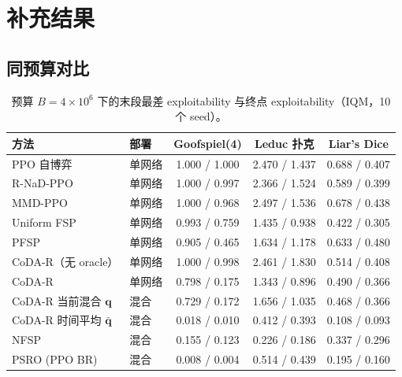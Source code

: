 \documentclass{article}
\theoremstyle{plain}
\theoremstyle{remark}
\newcommand{\bq}{{\bm{q}}}
\newcommand{\codar}{CoDA-R}
\newcommand{\rnad}{R-NaD-PPO}
\begin{document}
\FloatBarrier
\section{补充结果}
\label{app:extra}

\subsection{同预算对比}

\begin{table}[!htbp]
\caption{预算 $B=4\times10^6$ 下的末段最差 exploitability 与终点 exploitability（IQM，10 个 seed）。}
\label{tab:main-full}
\begin{center}
\footnotesize
\begin{tabular}{llccc}
\toprule
方法 & 部署 & Goofspiel(4) & Leduc 扑克 & Liar's Dice \\
\midrule
PPO 自博弈 & 单网络 & 1.000 / 1.000 & 2.470 / 1.437 & 0.688 / 0.407 \\
\rnad{} & 单网络 & 1.000 / 0.997 & 2.366 / 1.524 & 0.589 / 0.399 \\
MMD-PPO & 单网络 & 1.000 / 0.968 & 2.497 / 1.536 & 0.678 / 0.438 \\
Uniform FSP & 单网络 & 0.993 / 0.759 & 1.435 / 0.938 & 0.422 / 0.305 \\
PFSP & 单网络 & 0.905 / 0.465 & 1.634 / 1.178 & 0.633 / 0.480 \\
\codar{}（无 oracle） & 单网络 & 1.000 / 0.998 & 2.461 / 1.830 & 0.514 / 0.408 \\
\codar{} & 单网络 & 0.798 / 0.175 & 1.343 / 0.896 & 0.490 / 0.366 \\
\midrule
\codar{} 当前混合 $\bq$ & 混合 & 0.729 / 0.172 & 1.656 / 1.035 & 0.468 / 0.366 \\
\codar{} 时间平均 $\bar{\bq}$ & 混合 & 0.018 / 0.010 & 0.412 / 0.393 & 0.108 / 0.093 \\
NFSP & 混合 & 0.155 / 0.123 & 0.226 / 0.186 & 0.337 / 0.296 \\
PSRO (PPO BR) & 混合 & 0.008 / 0.004 & 0.514 / 0.439 & 0.195 / 0.160 \\
\bottomrule
\end{tabular}
\end{center}
\end{table}
\end{document}
